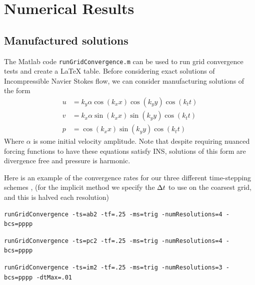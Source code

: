 
\newpage
\section{Numerical Results} \label{sec:numerical_results}

\subsection{Manufactured solutions}

\mni
The Matlab code \texttt{runGridConvergence.m} can be used to run grid convergence tests and create a LaTeX table. Before considering exact solutions of Incompressible Navier Stokes flow, we can consider manufacturing solutions of the form
\begin{subequations} \label{eq:TrigMSsolution}
	\begin{align}
		u &= k_y \alpha \cos ( k_x x ) \cos( k_y y) \cos(k_t t) \\
		v &= k_x \alpha \sin ( k_x x ) \sin( k_y y) \cos(k_t t) \\
		p &= \cos (k_x x ) \sin (k_y y) \cos(k_t t)
	\end{align}
\end{subequations}
Where $\alpha$ is some initial velocity amplitude. Note that despite requiring nuanced forcing functions to have these equations satisfy INS, solutions of this form are divergence free and pressure is harmonic.


Here is an example of the convergence rates for our three different time-stepping schemes , (for the implicit method we specify the $\Delta t$ to use on the coarsest grid, and this is halved each resolution)
\begin{table}[h!]
\footnotesize
\begin{center}

\begin{Verbatim}[fontsize=\small]
runGridConvergence -ts=ab2 -tf=.25 -ms=trig -numResolutions=4 -bcs=pppp
\end{Verbatim}



\vspace{2em}

\begin{Verbatim}[fontsize=\small]
runGridConvergence -ts=pc2 -tf=.25 -ms=trig -numResolutions=4 -bcs=pppp
\end{Verbatim}


\vspace{2em}

\begin{Verbatim}[fontsize=\small]
runGridConvergence -ts=im2 -tf=.25 -ms=trig -numResolutions=3 -bcs=pppp -dtMax=.01
\end{Verbatim}

\end{center}
\end{table}

